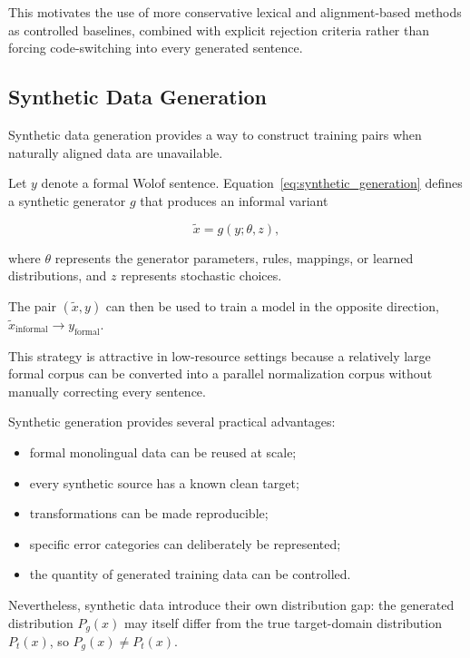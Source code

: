 \documentclass[12pt, a4paper, twoside, openany]{report}
\begin{document}
This motivates the use of more conservative lexical and alignment-based methods as controlled baselines, combined with explicit rejection criteria rather than forcing code-switching into every generated sentence.


\subsection{Synthetic Data Generation}

Synthetic data generation provides a way to construct training pairs when naturally aligned data are unavailable.

Let $y$ denote a formal Wolof sentence. Equation~\eqref{eq:synthetic_generation} defines a synthetic generator $g$ that produces an informal variant

\begin{equation}
	\tilde{x} = g(y;\theta,z),
	\label{eq:synthetic_generation}
\end{equation}

where $\theta$ represents the generator parameters, rules, mappings, or learned distributions, and $z$ represents stochastic choices.

The pair $(\tilde{x},y)$ can then be used to train a model in the opposite direction, $\tilde{x}_{\text{informal}} \longrightarrow y_{\text{formal}}$.

This strategy is attractive in low-resource settings because a relatively large formal corpus can be converted into a parallel normalization corpus without manually correcting every sentence.

Synthetic generation provides several practical advantages:

\begin{itemize}
	\item formal monolingual data can be reused at scale;
	\item every synthetic source has a known clean target;
	\item transformations can be made reproducible;
	\item specific error categories can deliberately be represented;
	\item the quantity of generated training data can be controlled.
\end{itemize}

Nevertheless, synthetic data introduce their own distribution gap: the generated distribution $P_g(x)$ may itself differ from the true target-domain distribution $P_t(x)$, so $P_g(x) \neq P_t(x)$.
\end{document}
